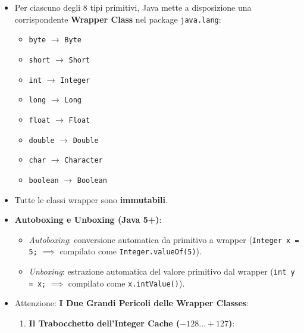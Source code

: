 \documentclass[11pt,a4paper]{article}
\newcommand{\passthrough}[1]{#1}
\providecommand{\tightlist}{\setlength{\itemsep}{0pt}\setlength{\parskip}{0pt}}
\begin{document}
\begin{itemize}
\tightlist
\item
  Per ciascuno degli 8 tipi primitivi, Java mette a disposizione una
  corrispondente \textbf{Wrapper Class} nel package
  \passthrough{\lstinline!java.lang!}:

  \begin{itemize}
  \tightlist
  \item
    \passthrough{\lstinline!byte!} \(\rightarrow\)
    \passthrough{\lstinline!Byte!}
  \item
    \passthrough{\lstinline!short!} \(\rightarrow\)
    \passthrough{\lstinline!Short!}
  \item
    \passthrough{\lstinline!int!} \(\rightarrow\)
    \passthrough{\lstinline!Integer!}
  \item
    \passthrough{\lstinline!long!} \(\rightarrow\)
    \passthrough{\lstinline!Long!}
  \item
    \passthrough{\lstinline!float!} \(\rightarrow\)
    \passthrough{\lstinline!Float!}
  \item
    \passthrough{\lstinline!double!} \(\rightarrow\)
    \passthrough{\lstinline!Double!}
  \item
    \passthrough{\lstinline!char!} \(\rightarrow\)
    \passthrough{\lstinline!Character!}
  \item
    \passthrough{\lstinline!boolean!} \(\rightarrow\)
    \passthrough{\lstinline!Boolean!}
  \end{itemize}
\item
  Tutte le classi wrapper sono \textbf{immutabili}.
\item
  \textbf{Autoboxing e Unboxing (Java 5+)}:

  \begin{itemize}
  \tightlist
  \item
    \emph{Autoboxing}: conversione automatica da primitivo a wrapper
    (\passthrough{\lstinline!Integer x = 5;!} \(\implies\) compilato
    come \passthrough{\lstinline!Integer.valueOf(5)!}).
  \item
    \emph{Unboxing}: estrazione automatica del valore primitivo dal
    wrapper (\passthrough{\lstinline!int y = x;!} \(\implies\) compilato
    come \passthrough{\lstinline!x.intValue()!}).
  \end{itemize}
\item
  Attenzione: \textbf{I Due Grandi Pericoli delle Wrapper Classes}:

  \begin{enumerate}
  \def\labelenumi{\arabic{enumi}.}
  \item
    \textbf{Il Trabocchetto dell'Integer Cache (\(-128 \dots +127\))}:


\end{enumerate}
\end{itemize}
\end{document}
